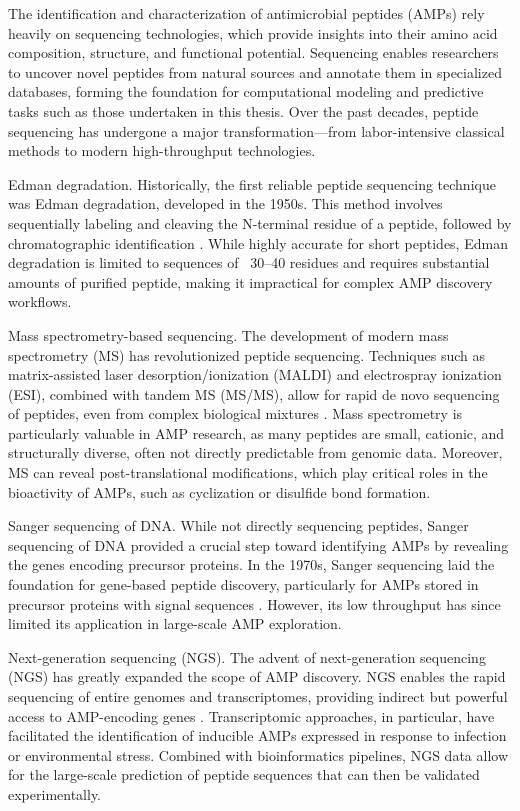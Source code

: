 \documentclass[a4paper,twoside,12pt]{book}
\begin{document}
The identification and characterization of antimicrobial peptides (AMPs) rely heavily on sequencing technologies, which provide insights into their amino acid composition, structure, and functional potential. Sequencing enables researchers to uncover novel peptides from natural sources and annotate them in specialized databases, forming the foundation for computational modeling and predictive tasks such as those undertaken in this thesis. Over the past decades, peptide sequencing has undergone a major transformation—from labor-intensive classical methods to modern high-throughput technologies.

Edman degradation. Historically, the first reliable peptide sequencing technique was Edman degradation, developed in the 1950s. This method involves sequentially labeling and cleaving the N-terminal residue of a peptide, followed by chromatographic identification \cite{bib:edman1967}. While highly accurate for short peptides, Edman degradation is limited to sequences of ~30–40 residues and requires substantial amounts of purified peptide, making it impractical for complex AMP discovery workflows.

Mass spectrometry-based sequencing. The development of modern mass spectrometry (MS) has revolutionized peptide sequencing. Techniques such as matrix-assisted laser desorption/ionization (MALDI) and electrospray ionization (ESI), combined with tandem MS (MS/MS), allow for rapid de novo sequencing of peptides, even from complex biological mixtures \cite{bib:aebersold2016}. Mass spectrometry is particularly valuable in AMP research, as many peptides are small, cationic, and structurally diverse, often not directly predictable from genomic data. Moreover, MS can reveal post-translational modifications, which play critical roles in the bioactivity of AMPs, such as cyclization or disulfide bond formation.

Sanger sequencing of DNA. While not directly sequencing peptides, Sanger sequencing of DNA provided a crucial step toward identifying AMPs by revealing the genes encoding precursor proteins. In the 1970s, Sanger sequencing laid the foundation for gene-based peptide discovery, particularly for AMPs stored in precursor proteins with signal sequences \cite{bib:sanger1977}. However, its low throughput has since limited its application in large-scale AMP exploration.

Next-generation sequencing (NGS). The advent of next-generation sequencing (NGS) has greatly expanded the scope of AMP discovery. NGS enables the rapid sequencing of entire genomes and transcriptomes, providing indirect but powerful access to AMP-encoding genes \cite{bib:goodwin2016}. Transcriptomic approaches, in particular, have facilitated the identification of inducible AMPs expressed in response to infection or environmental stress. Combined with bioinformatics pipelines, NGS data allow for the large-scale prediction of peptide sequences that can then be validated experimentally.
\end{document}
